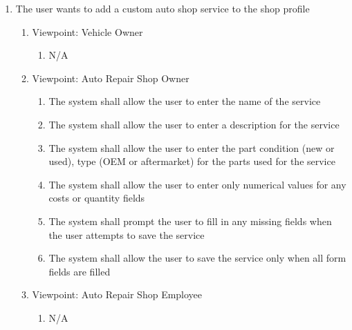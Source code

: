 \documentclass[12pt]{article}
\begin{document}
\begin{enumerate}[resume*=business_events]
	\item The user wants to add a custom auto shop service to the shop profile
	      \begin{enumerate}[VP\arabic*.]
		      \item Viewpoint: Vehicle Owner
		            \begin{enumerate}
			            \item[] N/A
		            \end{enumerate}
		      \item Viewpoint: Auto Repair Shop Owner
		            \begin{enumerate}
			            \item The system shall allow the user to enter the name of the service
			            \item The system shall allow the user to enter a description for the service
			            \item The system shall allow the user to enter the part condition (new or used), type (OEM or
			                  aftermarket) for the parts used for the service
			            \item The system shall allow the user to enter only numerical values for any costs or quantity fields
			            \item The system shall prompt the user to fill in any missing fields when the user attempts to save the
			                  service
			            \item The system shall allow the user to save the service only when all form fields are filled
		            \end{enumerate}
		      \item Viewpoint: Auto Repair Shop Employee
		            \begin{enumerate}
			            \item[] N/A
		            \end{enumerate}
	      \end{enumerate}


\end{enumerate}
\end{document}
